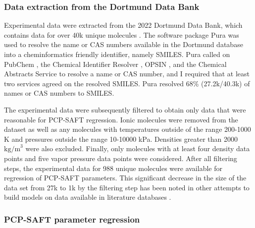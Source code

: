 
\subsubsection{Data extraction from the Dortmund Data Bank}

Experimental data were extracted from the 2022 Dortmund Data Bank, which contains data for over 40k unique molecules \cite{dortmunddatabank}. The software package Pura \cite{purapython} was used to resolve the name or CAS numbers available in the Dortmund database into a cheminformatics friendly identifier, namely SMILES. Pura called on PubChem \cite{Kim2020}, the Chemical Identifier Resolver \cite{cir}, OPSIN \cite{Lowe2011}, and the Chemical Abstracts Service \cite{commonchem} to resolve a name or CAS number, and I required that at least two services agreed on the resolved SMILES. Pura resolved 68\% (27.2k/40.3k) of names or CAS numbers to SMILES. 

The experimental data were subsequently filtered to obtain only data that were reasonable for PCP-SAFT regression. Ionic molecules were removed from the dataset as well as any molecules with temperatures outside of the range 200-1000 K and pressures outside the range 10-10000 kPa. Densities greater than 2000 $\text{kg/m}^{3}$ were also excluded. Finally, only molecules with at least four density data points and five vapor pressure data points were considered. After all filtering steps, the experimental data for 988 unique molecules were available for regression of PCP-SAFT parameters. This significant decrease in the size of the data set from 27k to 1k by the filtering step has been noted in other attempts to build models on data available in literature databases \cite{Fitzner2020, Gao2018}. 

\subsubsection{PCP-SAFT parameter regression}

